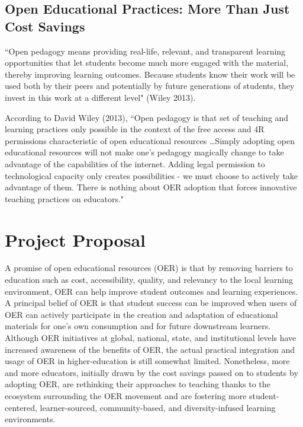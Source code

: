 \documentclass[11pt]{article}
\begin{document}
\subsection{Open Educational Practices: More Than Just Cost Savings}
``Open pedagogy means providing real-life, relevant, and transparent learning opportunities that let students become much more engaged with the material, thereby improving learning outcomes. Because students know their work will be used both by their peers and potentially by future generations of students, they invest in this work at a different level" (Wiley 2013).

According to David Wiley (2013), ``Open pedagogy is that set of teaching and learning practices only possible in the context of the free access and 4R permissions characteristic of open educational resources \ldots Simply adopting open educational resources will not make one's pedagogy magically change to take advantage of the capabilities of the internet. Adding legal permission to technological capacity only creates possibilities - we must choose to actively take advantage of them. There is nothing about OER adoption that forces innovative teaching practices on educators."


\section{Project Proposal}

A promise of open educational resources (OER) is that by removing barriers to education such as cost, accessibility, quality, and relevancy to the local learning environment, OER can help improve student outcomes and learning experiences.  A principal belief of OER is that student success can be improved when users of OER can actively participate in the creation and adaptation of educational materials for one's own consumption and for future downstream learners.  Although OER initiatives at global, national, state, and institutional levels have increased awareness of the benefits of OER, the actual practical integration and usage of OER in higher-education is still somewhat limited.  Nonetheless, more and more educators, initially drawn by the cost savings passed on to students by adopting OER, are rethinking their approaches to teaching thanks to the ecosystem surrounding the OER movement and are fostering more student-centered, learner-sourced, community-based, and diversity-infused learning environments.
\end{document}
